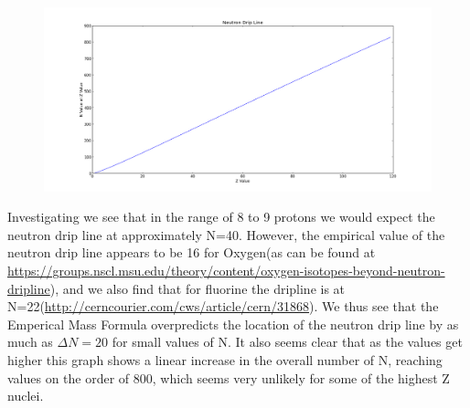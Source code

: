 \documentclass[11pt]{article} %
\begin{document}
\vspace{1mm}
\begin{figure}[h]
\centering
\includegraphics[width=\linewidth]{"NeutronDripLine"}
\end{figure}
\vspace{1mm}


Investigating we see that in the range of 8 to 9 protons we would expect the neutron drip line at approximately N=40. However, the empirical value of the neutron drip line appears to be 16 for Oxygen(as can be found at \url{https://groups.nscl.msu.edu/theory/content/oxygen-isotopes-beyond-neutron-dripline}), and we also find that for fluorine the dripline is at N=22(\url{http://cerncourier.com/cws/article/cern/31868}). We thus see that the Emperical Mass Formula overpredicts the location of the neutron drip line by as much as $\Delta N=20$ for small values of N. It also seems clear that as the values get higher this graph shows a linear increase in the overall number of N, reaching values on the order of 800, which seems very unlikely for some of the highest Z nuclei.  
\end{document}
